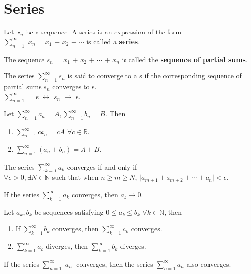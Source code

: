 \documentclass{report}
\begin{document}
\section{Series}
\begin{definition}
Let $x_n$ be a sequence. A series is an expression of the form \\ 
$\sum_{n=1}^{\infty}$ $x_n$ = $x_1$ + $x_2$ + $\cdots$ is called a \textbf{series}.
\end{definition}

\begin{definition}
The sequence $s_n$ = $x_1$ + $x_2$ + $\cdots$ + $x_n$ is called the \textbf{sequence of partial sums}.
\end{definition}
The series $\sum_{n=1}^{\infty}s_n$ is said to converge to a s if the corresponding sequence of partial sums $s_n$ converges to s.\\
$\sum_{n=1}^{\infty}$ = s $\leftrightarrow$  $s_n$ $\rightarrow$ s.

\begin{theorem}
Let $\sum_{n=1}^{\infty}a_n = A,\sum_{n=1}^{\infty}b_n = B$. Then 
\begin{enumerate}
\item $\sum_{n=1}^{\infty}ca_n = cA$ $\forall c \in \mathbb{R}$.
\item $\sum_{n=1}^{\infty}(a_n + b_n) = A + B$.
\end{enumerate} 
\end{theorem}

\begin{theorem}
The series $\sum_{k=1}^{\infty}a_k$ converges if and only if  \\ $\forall \epsilon > 0, \exists N \in \mathbb{N}$ such that when $n \geq m \geq N$, $\lvert a_{m+1} + a_{m+2} + \cdots + a_n\rvert < \epsilon$.
\end{theorem}

\begin{theorem}
If the series  $\sum_{k=1}^{\infty}a_k$ converges, then $a_k \rightarrow 0$.
\end{theorem}

\begin{theorem}
Let $a_k,b_k$ be sequences satisfying $0 \leq a_k \leq b_k$ $\forall k \in \mathbb{N}$, then 
\begin{enumerate}
\item If  $\sum_{k=1}^{\infty}b_k$ converges, then  $\sum_{k=1}^{\infty}a_k$ converges.
\item  $\sum_{k=1}^{\infty}a_k$ diverges, then  $\sum_{k=1}^{\infty}b_k$ diverges.
\end{enumerate}
\end{theorem}
\begin{theorem}
If the series $\sum_{n=1}^{\infty}\lvert a_n \rvert$ converges, then the series $\sum_{n=1}^{\infty}a_n$ also converges.
\end{theorem}
\end{document}
